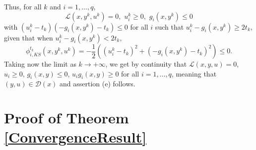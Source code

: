 Thus, for all $k$ and $i=1,\ldots,q$, 
 \[
 \mathcal{L}(x,y^{k},u^{k})=0,\,\,
u_{i}^{k}\geq0,\,\, g_{i}(x,y^{k})\leq0 
\] with $(u_{i}^{k}-t_{k})(-g_{i}(x,y^{k})-t_{k})\leq0$ for all $i$ such that $u_{i}^{k}-g_{i}(x,y^{k})\geq2t_{k}$, given that when $u_{i}^{k}-g_{i}(x,y^{k})<2t_{k}$, 
\[
\phi^{t_{k}}_{i,KS}(x,y^{k},u^{k}
)=-\dfrac{1}{2}((u_{i}^{k}-t_{k})^{2}+(-g_{i}(x,y^{k})-t_{k})^{2})\leq0.
\]
Taking now the limit as $k\rightarrow +\infty$, we get by continuity that $\mathcal{L}(x,y,u)=0$, $u_{i}\geq0$, $g_{i}(x,y)\leq0$, $u_{i}
g_{i}(x,y)\geq0$ for all $i=1,\ldots,q$, meaning that $(y,u)\in\mathcal{D}
(x)$  and assertion (e) follows.\\


\section{Proof of Theorem \ref{ConvergenceResult}}\label{B}
